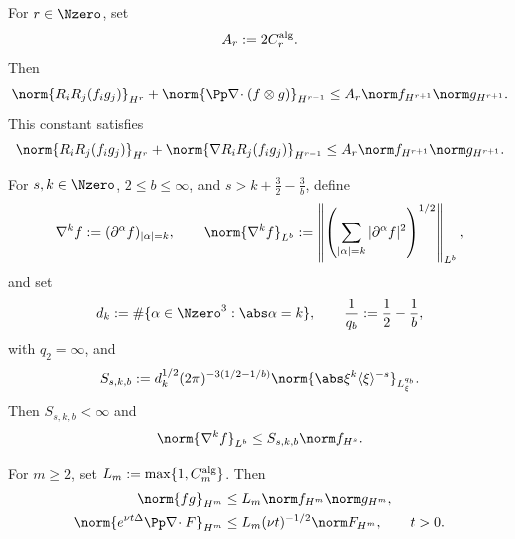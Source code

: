 \begin{lemma}
\label{u:lem:qc-analytic-constants}
For \(r\in\Nzero\), set
\[
 A_r:=2C_r^{\rm alg}.
\]
Then
\begin{equation}
 \norm{R_iR_j(f_i g_j)}_{H^r}
 +\norm{\Pp\nabla\!\cdot(f\otimes g)}_{H^{r-1}}
 \le A_r\norm f_{H^{r+1}}\norm g_{H^{r+1}}.
 \label{u:eq:qc-product-constant}
\end{equation}
This constant satisfies
\begin{equation}
 \norm{R_iR_j(f_i g_j)}_{H^r}
 +\norm{\nabla R_iR_j(f_i g_j)}_{H^{r-1}}
 \le A_r\norm f_{H^{r+1}}\norm g_{H^{r+1}}.
 \label{u:eq:qc-pressure-product-constant}
\end{equation}
\begin{samepage}
For \(s,k\in\Nzero\), \(2\le b\le\infty\), and
\(s>k+\frac32-\frac3b\), define
\[
 \nabla^k f:=(\partial^\alpha f)_{|\alpha|=k},
 \qquad
 \norm{\nabla^k f}_{L^b}
 :=\left\|\left(
   \sum_{|\alpha|=k}|\partial^\alpha f|^2
 \right)^{1/2}\right\|_{L^b},
\]
and set
\[
 d_k:=\#\{\alpha\in\Nzero^3:\abs\alpha=k\},
 \qquad
 \frac1{q_b}:=\frac12-\frac1b,
\]
with \(q_2=\infty\), and
\begin{equation}
 S_{s,k,b}:=
 d_k^{1/2}(2\pi)^{-3(1/2-1/b)}
 \norm{\abs\xi^k\langle\xi\rangle^{-s}}_{L^{q_b}_\xi}.
 \label{u:eq:qc-embedding-constant-definition}
\end{equation}
Then \(S_{s,k,b}<\infty\) and
\begin{equation}
 \norm{\nabla^k f}_{L^b}\le S_{s,k,b}\norm f_{H^s}.
 \label{u:eq:qc-embedding-constant}
\end{equation}
\par
\end{samepage}
For \(m\ge2\), set \(L_m:=\max\{1,C_m^{\rm alg}\}\).  Then
\begin{align}
 \norm{fg}_{H^m}
 &\le L_m\norm f_{H^m}\norm g_{H^m},
 \label{u:eq:qc-algebra-constant}\\
 \norm{e^{\nu t\Delta}\Pp\nabla\!\cdot F}_{H^m}
 &\le L_m(\nu t)^{-1/2}\norm F_{H^m},
 \qquad t>0.
 \label{u:eq:qc-heat-constant}
\end{align}
\end{lemma}


